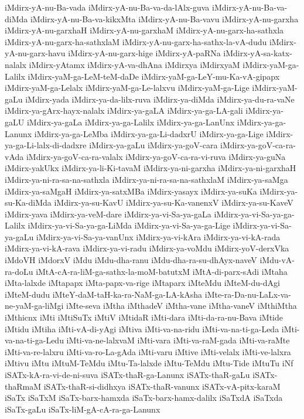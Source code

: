{iMdirx-yA-nu-Ba-vada
iMdirx-yA-nu-Ba-va-da-lAlx-guva
iMdirx-yA-nu-Ba-va-diMda
iMdirx-yA-nu-Ba-va-kikxMta
iMdirx-yA-nu-Ba-vavu
iMdirx-yA-nu-garxha
iMdirx-yA-nu-garxhaH
iMdirx-yA-nu-garxhaM
iMdirx-yA-nu-garx-ha-sathxla
iMdirx-yA-nu-garx-ha-sathxlaM
iMdirx-yA-nu-garx-ha-sathx-la-vA-dudu
iMdirx-yA-nu-garx-havu
iMdirx-yA-nu-garx-hige
iMdirx-yA-paRNa
iMdirx-yA-sa-katx-nalalx
iMdirx-yAtamx
iMdirx-yA-va-dhAna
iMdirxya
iMdirxyaM
iMdirx-yaM-ga-Lalilx
iMdirx-yaM-ga-LeM-teM-daDe
iMdirx-yaM-ga-LeY-mu-Ka-vA-gipapx
iMdirx-yaM-ga-Lelalx
iMdirx-yaM-ga-Le-lalxvu
iMdirx-yaM-ga-Lige
iMdirx-yaM-gaLu
iMdirx-yada
iMdirx-ya-da-lilx-ruva
iMdirx-ya-diMda
iMdirx-ya-du-ra-vaNe
iMdirx-ya-gArx-hayx-nalalx
iMdirx-ya-gaLA
iMdirx-ya-ga-LA-gali
iMdirx-ya-gaLU
iMdirx-ya-gaLa
iMdirx-ya-ga-Lalilx
iMdirx-ya-ga-LanUnx
iMdirx-ya-ga-Lanunx
iMdirx-ya-ga-LeMba
iMdirx-ya-ga-Li-dadxrU
iMdirx-ya-ga-Lige
iMdirx-ya-ga-Li-lalx-di-dadxre
iMdirx-ya-gaLu
iMdirx-ya-goV-cara
iMdirx-ya-goV-ca-ra-vAda
iMdirx-ya-goV-ca-ra-valalx
iMdirx-ya-goV-ca-ra-vi-ruva
iMdirx-ya-guNa
iMdirx-yakUkx
iMdirx-ya-li-Ki-tavaM
iMdirx-ya-ni-garxha
iMdirx-ya-ni-garxhaH
iMdirx-ya-ni-ra-sa-na-sathxla
iMdirx-ya-ni-ra-sa-na-sathxlaM
iMdirx-ya-saMga
iMdirx-ya-saMgaH
iMdirx-ya-satxMBa
iMdirx-yasayx
iMdirx-ya-suKa
iMdirx-ya-su-Ka-diMda
iMdirx-ya-su-KavU
iMdirx-ya-su-Ka-vanenxV
iMdirx-ya-su-KaveV
iMdirx-yava
iMdirx-ya-veM-dare
iMdirx-ya-vi-Sa-ya-gaLa
iMdirx-ya-vi-Sa-ya-ga-Lalilx
iMdirx-ya-vi-Sa-ya-ga-LiMda
iMdirx-ya-vi-Sa-ya-ga-Lige
iMdirx-ya-vi-Sa-ya-gaLu
iMdirx-ya-vi-Sa-ya-vanUnx
iMdirx-ya-vi-kAra
iMdirx-ya-vi-kA-rada
iMdirx-ya-vi-kA-rava
iMdirx-ya-vi-radu
iMdirx-ya-voMdu
iMdirx-yoV-derxVka
iMdoVH
iMdorxV
iMdu
iMdu-dha-ranu
iMdu-dha-ra-su-dhAyx-naveV
iMdu-vA-ra-doLu
iMtA-cA-ra-liM-ga-sathx-la-moM-batutxM
iMtA-di-parx-sAdi
iMtaha
iMta-lalxde
iMtapapx
iMta-papx-va-rige
iMtaparx
iMteMdu
iMteM-du-dAgi
iMteM-dudu
iMteY-daM-taH-ka-ra-NaM-ga-LA-kAsha
iMte-ra-Da-nu-LaLx-va-ne-yaM-ga-liMgi
iMte-seva
iMtha
iMthadeV
iMtha-vane
iMtha-vaneV
iMthiMtha
iMthicnx
iMti
iMtiSuTx
iMtiV
iMtidaR
iMti-dara
iMti-da-ra-nu-Bava
iMtide
iMtidu
iMtiha
iMti-vA-di-yAgi
iMtiva
iMti-va-na-ridu
iMti-va-na-ti-ga-Leda
iMti-va-na-ti-ga-Ledu
iMti-va-ne-lalxvaM
iMti-vara
iMti-va-raM-gada
iMti-va-raMte
iMti-va-re-lalxru
iMti-va-ro-La-gAda
iMti-varu
iMtive
iMti-velalx
iMti-ve-lalxra
iMtivu
iMtu
iMtuM-TeMdu
iMtu-Ta-lalxde
iMtu-TeMdu
iMtu-Tide
iMtuTu
iNf
iSATx-kA-ra-vi-de-ni-suva
iSATx-thaR-ga-Lanunx
iSATx-thaR-gaLu
iSATx-thaRmaM
iSATx-thaR-si-didhxya
iSATx-thaR-vanunx
iSATx-vA-pitx-karaM
iSaTx
iSaTxM
iSaTx-barx-hamxda
iSaTx-barx-hamx-dalilx
iSaTxdA
iSaTxda
iSaTx-gaLu
iSaTx-liM-gA-cA-ra-ga-Lanunx
}
